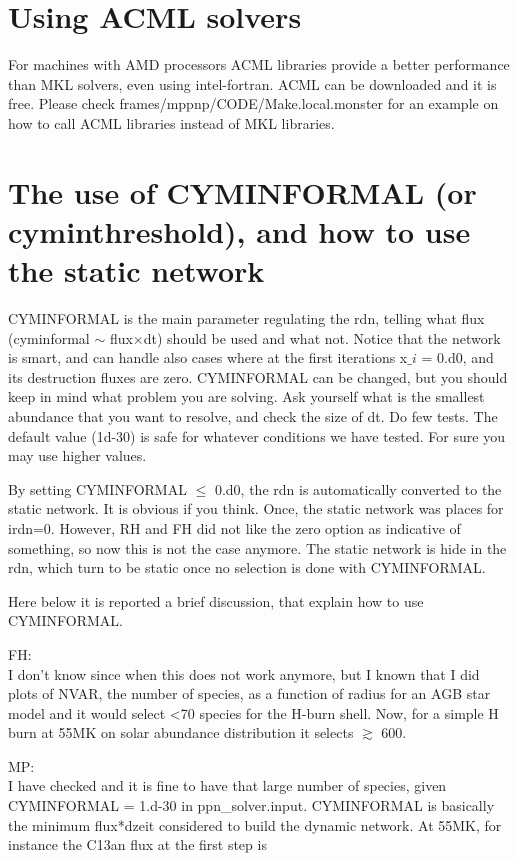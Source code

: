 \section{Using ACML solvers}

For machines with AMD processors ACML libraries provide a better performance than MKL solvers, even using intel-fortran. ACML can be downloaded and it is free.
Please check frames/mppnp/CODE/Make.local.monster for an example on how to call ACML libraries instead of MKL libraries. 




\section{The use of CYMINFORMAL (or cyminthreshold), and how to use the static network}

CYMINFORMAL is the main parameter regulating the rdn, telling what flux (cyminformal $\sim$ flux$\times$dt) 
should be used and what not. Notice that the network is smart, and can handle also cases where at the first
iterations x$\_i$ = 0.d0, and its destruction fluxes are zero.
CYMINFORMAL can be changed, but you should keep in mind what problem you are solving. Ask yourself what is the 
smallest abundance that you want to resolve, and check the size of dt. Do few tests.
The default value (1d-30) is safe for whatever conditions we have tested. For sure you may use higher values.    

By setting CYMINFORMAL $\leq$ 0.d0, the rdn is automatically converted to the static network.
It is obvious if you think. Once, the static network was places for irdn=0. However, RH and FH 
did not like the zero option as indicative of something, so now this is not the case anymore.
The static network is hide in the rdn, which turn to be static once no selection is done with 
CYMINFORMAL. 




Here below it is reported a brief discussion, that explain how to use CYMINFORMAL.

FH:\\
I don’t know since when this does not work anymore, but I known that I did plots of NVAR, the number of species, as a function of radius for an AGB star model and it would select <70 species for the H-burn shell. Now, for a simple H burn at 55MK on solar abundance distribution it selects $\gtrsim$ 600. 

MP:\\
I have checked and it is fine to have that large number of species, given CYMINFORMAL = 1.d-30 in ppn\_solver.input.
CYMINFORMAL is basically the minimum flux*dzeit considered to build the dynamic network.
At 55MK, for instance the C13an flux at the first step is\\

